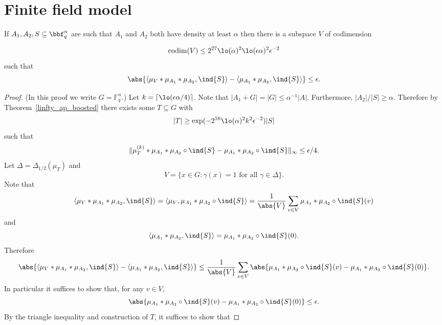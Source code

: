 \chapter{Finite field model}

\begin{theorem}
  \label{ap_in_ff}
\leanok
If $A_1,A_2,S\subseteq \bbf_q^n$ are such that $A_1$ and $A_2$ both have density at least $\alpha$ then there is a subspace $V$ of codimension

\[\mathrm{codim}(V)\leq 2^{27}\lo(\alpha)^2\lo(\epsilon \alpha)^2\epsilon^{-2}\]
such that
\[\abs{\langle \mu_V\ast \mu_{A_1}\ast \mu_{A_2},\ind{S}\rangle-\langle \mu_{A_1}\ast \mu_{A_2},\ind{S}\rangle}\leq \epsilon.\]
\end{theorem}

\begin{proof}
(In this proof we write $G=\mathbb{F}_q^n$.) Let $k=\lceil \lo(\epsilon\alpha/4)\rceil$. Note that $\lvert A_1+G\rvert=\lvert G\rvert\leq \alpha^{-1}\lvert A\rvert$. Furthermore, $\lvert A_2\rvert/\lvert S\rvert\geq \alpha$. Therefore by Theorem~\ref{linfty_ap_boosted} there exists some $T\subseteq G$ with
\[\lvert T\rvert \geq \exp(-2^{16}\lo(\alpha)^2k^2\epsilon^{-2})\lvert S\rvert\]
such that
\[\| \mu_T^{(k)}\ast \mu_{A_1}\ast \mu_{A_2}\circ \ind{S}-\mu_{A_1}\ast \mu_{A_2}\circ \ind{S}\|_{\infty}\leq \epsilon/4.\]
Let $\Delta=\Delta_{1/2}(\mu_T)$ and
\[V = \{ x \in G : \gamma(x)=1\textrm{ for all }\gamma\in\Delta\}.\]
Note that
\[\langle \mu_V\ast \mu_{A_1}\ast \mu_{A_2},\ind{S}\rangle = \langle \mu_V,\mu_{A_1}\ast \mu_{A_2}\circ \ind{S}\rangle=\frac{1}{\abs{V}}\sum_{v\in V}\mu_{A_1}\ast \mu_{A_2}\circ \ind{S}(v)\]
and
\[\langle \mu_{A_1}\ast \mu_{A_2},\ind{S}\rangle = \mu_{A_1}\ast \mu_{A_2}\circ\ind{S}(0).\]
Therefore
\[\abs{\langle \mu_V\ast \mu_{A_1}\ast \mu_{A_2},\ind{S}\rangle-\langle \mu_{A_1}\ast \mu_{A_2},\ind{S}\rangle}\leq \frac{1}{\abs{V}}\sum_{v\in V}\abs{\mu_{A_1}\ast \mu_{A_2}\circ \ind{S}(v)-\mu_{A_1}\ast \mu_{A_2}\circ \ind{S}(0)}.\]
In particular it suffices to show that, for any $v\in V$,
\[\abs{\mu_{A_1}\ast \mu_{A_2}\circ \ind{S}(v)-\mu_{A_1}\ast \mu_{A_2}\circ \ind{S}(0)}\leq \epsilon.\]
By the triangle inequality and construction of $T$, it suffices to show that


\end{proof}
